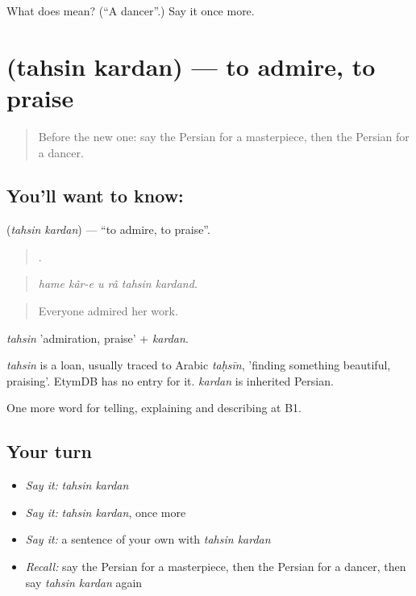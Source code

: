 \begin{tcolorbox}[breakable,colback=teal!4,colframe=teal!35!black,title={Before you move on}]
What does  mean? (\textquotedblleft{}A dancer\textquotedblright{}.) Say it once more.
\end{tcolorbox}
\section[\texorpdfstring{\fa{تحسین} \fa{کردن} (tahsin kardan)}{تحسین کردن (tahsin kardan)}]{  (tahsin kardan) — to admire, to praise}

\label{lesson:FA-C527-tahsin-kardan}



\begin{quote}
Before the new one: say the Persian for a masterpiece, then the Persian for a dancer.
\end{quote}

\subsection*{You'll want to know:  }
\textbf{ } (\emph{tahsin kardan}) — \textquotedblleft{}to admire, to praise\textquotedblright{}.

\begin{quote}
     .
\end{quote}

\begin{quote}
\emph{hame kâr-e u râ tahsin kardand.}
\end{quote}

\begin{quote}
Everyone admired her work.
\end{quote}

\emph{tahsin} 'admiration, praise' + \emph{kardan}.

\begin{cousinweb}
\emph{tahsin} is a loan, usually traced to Arabic \emph{taḥsīn}, 'finding something beautiful, praising'. EtymDB has no entry for it. \emph{kardan} is inherited Persian.
\end{cousinweb}

\begin{grammarlens}[title={What you've built}]
One more word for telling, explaining and describing at B1.
\end{grammarlens}

\subsection*{Your turn}
\begin{itemize}
\raggedright
  \item \emph{Say it:} \emph{tahsin kardan}
  \item \emph{Say it:} \emph{tahsin kardan}, once more
  \item \emph{Say it:} a sentence of your own with \emph{tahsin kardan}
  \item \emph{Recall:} say the Persian for a masterpiece, then the Persian for a dancer, then say \emph{tahsin kardan} again
\end{itemize}

